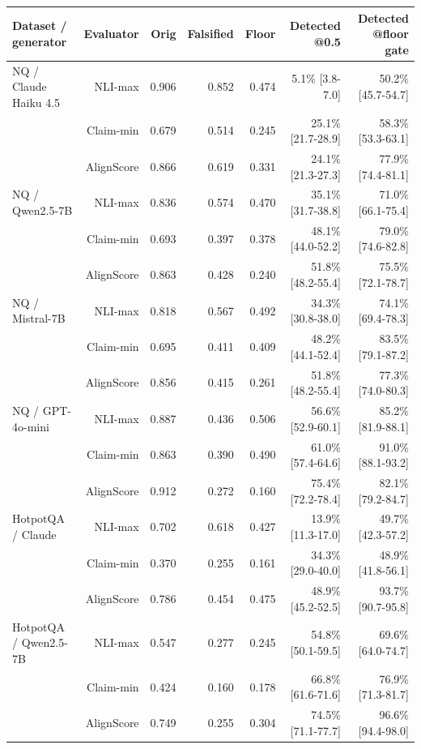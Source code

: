\documentclass[11pt]{article}
\begin{document}
\begin{table}[t]
\centering
\small
\begin{tabular}{lrrrrrr}
\toprule
\textbf{Dataset / generator} & \textbf{Evaluator} & \textbf{Orig} & \textbf{Falsified} & \textbf{Floor} & \textbf{Detected @0.5} & \textbf{Detected @floor gate} \\
\midrule
NQ / Claude Haiku 4.5 & NLI-max & 0.906 & 0.852 & 0.474 & 5.1\% [3.8-7.0] & 50.2\% [45.7-54.7] \\
 & Claim-min & 0.679 & 0.514 & 0.245 & 25.1\% [21.7-28.9] & 58.3\% [53.3-63.1] \\
 & AlignScore & 0.866 & 0.619 & 0.331 & 24.1\% [21.3-27.3] & 77.9\% [74.4-81.1] \\
NQ / Qwen2.5-7B & NLI-max & 0.836 & 0.574 & 0.470 & 35.1\% [31.7-38.8] & 71.0\% [66.1-75.4] \\
 & Claim-min & 0.693 & 0.397 & 0.378 & 48.1\% [44.0-52.2] & 79.0\% [74.6-82.8] \\
 & AlignScore & 0.863 & 0.428 & 0.240 & 51.8\% [48.2-55.4] & 75.5\% [72.1-78.7] \\
NQ / Mistral-7B & NLI-max & 0.818 & 0.567 & 0.492 & 34.3\% [30.8-38.0] & 74.1\% [69.4-78.3] \\
 & Claim-min & 0.695 & 0.411 & 0.409 & 48.2\% [44.1-52.4] & 83.5\% [79.1-87.2] \\
 & AlignScore & 0.856 & 0.415 & 0.261 & 51.8\% [48.2-55.4] & 77.3\% [74.0-80.3] \\
NQ / GPT-4o-mini & NLI-max & 0.887 & 0.436 & 0.506 & 56.6\% [52.9-60.1] & 85.2\% [81.9-88.1] \\
 & Claim-min & 0.863 & 0.390 & 0.490 & 61.0\% [57.4-64.6] & 91.0\% [88.1-93.2] \\
 & AlignScore & 0.912 & 0.272 & 0.160 & 75.4\% [72.2-78.4] & 82.1\% [79.2-84.7] \\
\midrule
HotpotQA / Claude & NLI-max & 0.702 & 0.618 & 0.427 & 13.9\% [11.3-17.0] & 49.7\% [42.3-57.2] \\
 & Claim-min & 0.370 & 0.255 & 0.161 & 34.3\% [29.0-40.0] & 48.9\% [41.8-56.1] \\
 & AlignScore & 0.786 & 0.454 & 0.475 & 48.9\% [45.2-52.5] & 93.7\% [90.7-95.8] \\
HotpotQA / Qwen2.5-7B & NLI-max & 0.547 & 0.277 & 0.245 & 54.8\% [50.1-59.5] & 69.6\% [64.0-74.7] \\
 & Claim-min & 0.424 & 0.160 & 0.178 & 66.8\% [61.6-71.6] & 76.9\% [71.3-81.7] \\
 & AlignScore & 0.749 & 0.255 & 0.304 & 74.5\% [71.1-77.7] & 96.6\% [94.4-98.0] \\

\end{tabular}
\end{table}
\end{document}

